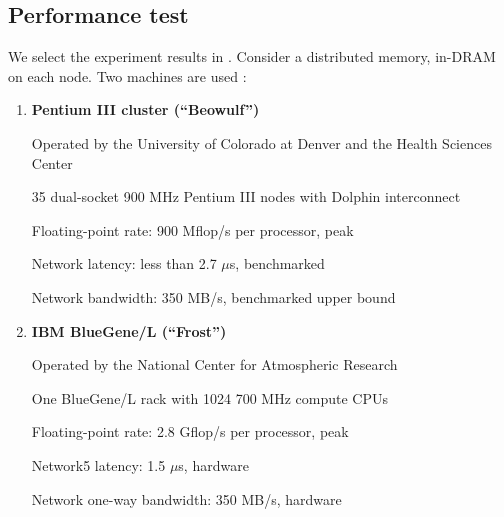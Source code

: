 \documentclass{article}
\begin{document}
\subsection{Performance test}

We select the experiment results in \cite{demmel_communication-optimal_2012}. Consider a distributed memory, in-DRAM on each node. Two machines are used :
\begin{enumerate}
	\item\textbf{ Pentium III cluster (“Beowulf”)}
	
	Operated by the University of Colorado at Denver and the Health
	Sciences Center
	
	35 dual-socket 900 MHz Pentium III nodes with Dolphin interconnect
	
	Floating-point rate: 900 Mflop/s per processor, peak
	
	Network latency: less than 2.7 $\mu$s, benchmarked
	
	 Network bandwidth: 350 MB/s, benchmarked upper bound
	 \item \textbf{IBM BlueGene/L (``Frost'')}


Operated by the National Center for Atmospheric Research

 One BlueGene/L rack with 1024 700 MHz compute CPUs

 Floating-point rate: 2.8 Gflop/s per processor, peak

 Network5
latency: 1.5 $\mu$s, hardware

 Network one-way bandwidth: 350 MB/s, hardware

\end{enumerate}
\end{document}
